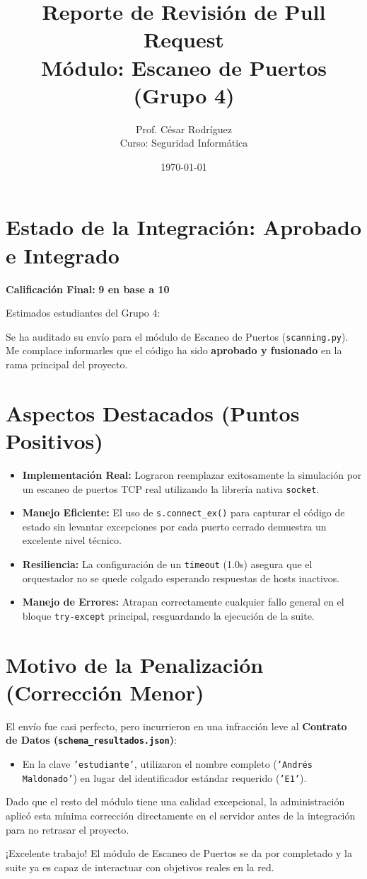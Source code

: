 \documentclass[12pt,a4paper]{article}
\title{Reporte de Revisión de Pull Request \\ \large Módulo: Escaneo de Puertos (Grupo 4)}
\author{Prof. César Rodríguez \\ \small Curso: Seguridad Informática}
\date{\today}
\begin{document}
\maketitle

\section*{Estado de la Integración: \textcolor{green!70!black}{Aprobado e Integrado}}

\noindent \textbf{Calificación Final:} \textbf{9 en base a 10}

\vspace{0.5cm}
Estimados estudiantes del Grupo 4:

Se ha auditado su envío para el módulo de Escaneo de Puertos (\texttt{scanning.py}). Me complace informarles que el código ha sido \textbf{aprobado y fusionado} en la rama principal del proyecto.

\section*{Aspectos Destacados (Puntos Positivos)}
\begin{itemize}[label=$\bullet$]
    \item \textbf{Implementación Real:} Lograron reemplazar exitosamente la simulación por un escaneo de puertos TCP real utilizando la librería nativa \texttt{socket}.
    \item \textbf{Manejo Eficiente:} El uso de \texttt{s.connect\_ex()} para capturar el código de estado sin levantar excepciones por cada puerto cerrado demuestra un excelente nivel técnico.
    \item \textbf{Resiliencia:} La configuración de un \texttt{timeout} (1.0s) asegura que el orquestador no se quede colgado esperando respuestas de hosts inactivos.
    \item \textbf{Manejo de Errores:} Atrapan correctamente cualquier fallo general en el bloque \texttt{try-except} principal, resguardando la ejecución de la suite.
\end{itemize}

\section*{Motivo de la Penalización (Corrección Menor)}
El envío fue casi perfecto, pero incurrieron en una infracción leve al \textbf{Contrato de Datos (\texttt{schema\_resultados.json})}:
\begin{itemize}[label=$\bullet$]
    \item En la clave \texttt{'estudiante'}, utilizaron el nombre completo (\texttt{'Andrés Maldonado'}) en lugar del identificador estándar requerido (\texttt{'E1'}).
\end{itemize}

Dado que el resto del módulo tiene una calidad excepcional, la administración aplicó esta mínima corrección directamente en el servidor antes de la integración para no retrasar el proyecto.

\vspace{1cm}
\noindent ¡Excelente trabajo! El módulo de Escaneo de Puertos se da por completado y la suite ya es capaz de interactuar con objetivos reales en la red.
\end{document}
